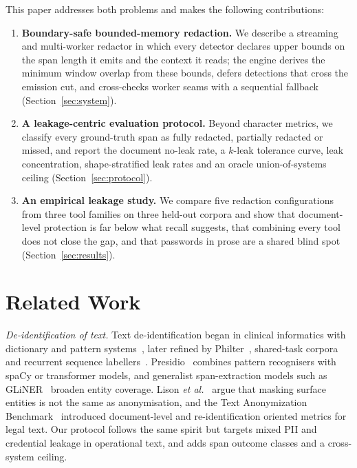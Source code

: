 \documentclass[conference]{IEEEtran}
\begin{document}
This paper addresses both problems and makes the following contributions:
\begin{enumerate}
\item \textbf{Boundary-safe bounded-memory redaction.} We describe a streaming
and multi-worker redactor in which every detector declares upper bounds on the
span length it emits and the context it reads; the engine derives the minimum
window overlap from these bounds, defers detections that cross the emission
cut, and cross-checks worker seams with a sequential fallback
(Section~\ref{sec:system}).
\item \textbf{A leakage-centric evaluation protocol.} Beyond character
metrics, we classify every ground-truth span as fully redacted, partially
redacted or missed, and report the document no-leak rate, a $k$-leak tolerance
curve, leak concentration, shape-stratified leak rates and an oracle
union-of-systems ceiling (Section~\ref{sec:protocol}).
\item \textbf{An empirical leakage study.} We compare five redaction
configurations from three tool families on three held-out corpora and show
that document-level protection is far below what recall suggests, that
combining every tool does not close the gap, and that passwords in prose are a
shared blind spot (Section~\ref{sec:results}).
\end{enumerate}

\section{Related Work}

\textit{De-identification of text.} Text de-identification began in clinical
informatics with dictionary and pattern systems~\cite{neamatullah2008deid},
later refined by Philter~\cite{norgeot2020philter}, shared-task
corpora~\cite{stubbs2015annotating} and recurrent sequence
labellers~\cite{dernoncourt2017deid}. Presidio~\cite{presidio} combines
pattern recognisers with spaCy or transformer models, and generalist
span-extraction models such as GLiNER~\cite{zaratiana2024gliner} broaden entity
coverage. Lison \emph{et al.}~\cite{lison2021anonymisation} argue that masking
surface entities is not the same as anonymisation, and the Text Anonymization
Benchmark~\cite{pilan2022tab} introduced document-level and re-identification
oriented metrics for legal text. Our protocol follows the same spirit but
targets mixed PII and credential leakage in operational text, and adds span
outcome classes and a cross-system ceiling.
\end{document}
